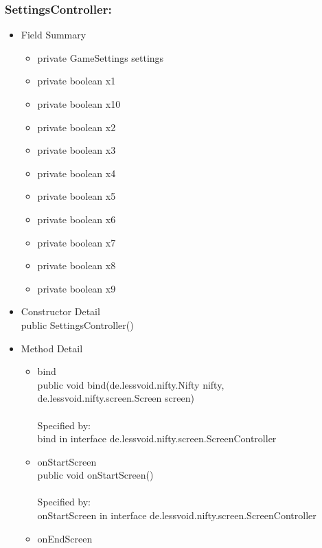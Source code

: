 \documentclass[letterpaper]{article}
\begin{document}
				\subsubsection*{SettingsController:}
				\vspace{0.1in}	
					\begin{itemize}
						\item	Field Summary
								\begin{itemize}
									\item	private GameSettings	settings 
									\item	private boolean	x1 
									\item	private boolean	x10 
									\item	private boolean	x2 
									\item	private boolean	x3 
									\item	private boolean	x4 
									\item	private boolean	x5 
									\item	private boolean	x6 
									\item	private boolean	x7 
									\item	private boolean	x8 
									\item	private boolean	x9 
								\end{itemize}
						\item	Constructor Detail \\
								public SettingsController()
						\item	Method Detail
								\begin{itemize}
									\item	bind \\
											public void bind(de.lessvoid.nifty.Nifty nifty, \\
		        de.lessvoid.nifty.screen.Screen screen) \\ \\
											Specified by: \\
											bind in interface de.lessvoid.nifty.screen.ScreenController
									\item	onStartScreen \\
											public void onStartScreen() \\ \\
											Specified by: \\
											onStartScreen in interface de.lessvoid.nifty.screen.ScreenController
									\item	onEndScreen \\

\end{itemize}
\end{itemize}
\end{document}
